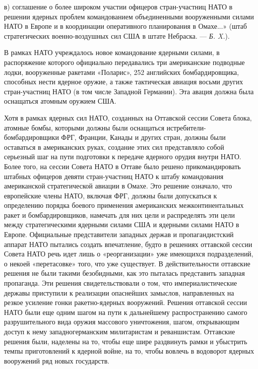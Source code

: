 \documentclass[12pt, a4paper, openany]{book}
\begin{document}
в) соглашение о более широком участии офицеров стран-участниц НАТО в решении ядерных проблем командованием объединенными вооруженными силами НАТО в Европе и в координации оперативного планирования в Омахе...» (штаб стратегических военно-воздушных сил США в штате Небраска. — \textit{Б. X.}).

В рамках НАТО учреждалось новое командование ядерными силами, в распоряжение которого официально передавались три американские подводные лодки, вооруженные ракетами «Поларис», 252 английских бомбардировщика, способных нести ядерное оружие, а также тактическая авиация восьми других стран-участниц НАТО (в том числе Западной Германии). Эта авация должна была оснащаться атомным оружием США.

Хотя в рамках ядерных сил НАТО, созданных на Оттавской сессии Совета блока, атомные бомбы, которыми должны были оснащаться истребители-бомбардировщики ФРГ, Франции, Канады и других стран, должны были оставаться в американских руках, создание этих сил представляло собой серьезный шаг на пути подготовки к передаче ядерного орудия внутри НАТО. Более того, на сессии Совета НАТО в Оттаве было решено прикомандировать штабных офицеров девяти стран-участниц НАТО к штабу командования американской стратегической авиации в Омахе. Это решение означало, что европейские члены НАТО, включая ФРГ, должны были допускаться к определению порядка боевого применения американских межконтинентальных ракет и бомбардировщиков, намечать для них цели и распределять эти цели между стратегическими ядерными силами США и ядерными силами НАТО в Европе. Официальные представители западных держав и пропагандистский аппарат НАТО пытались создать впечатление, будто в решениях оттавской сессии Совета НАТО речь идет лишь о «реорганизации» уже имеющихся подразделений, о некоей «перетасовке» того, что уже существует. В действительности оттавские решения не были такими безобидными, как это пыталась представить западная пропаганда. Эти решения свидетельствовали о том, что империалистические державы приступили к реализации опаснейших замыслов, направленных на резкое усиление гонки ракетно-ядерных вооружений. Решения оттавской сессии НАТО были еще одним шагом на пути к дальнейшему распространению самого разрушительного вида оружия массового уничтожения, шагом, открывающим доступ к нему западногерманским милитаристам и реваншистам. Оттавские решения были, наделены на то, чтобы еще шире раздвинуть рамки и убыстрить темпы приготовлений к ядерной войне, на то, чтобы вовлечь в водоворот ядерных вооружений ряд новых государств.
\end{document}
